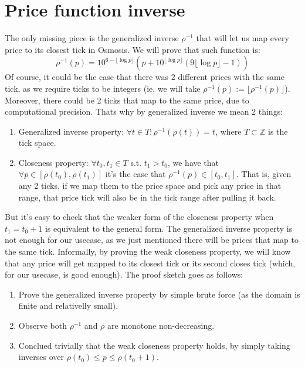 \documentclass[11pt]{article}
\begin{document}
\section{Price function inverse}
The only missing piece is the generalized inverse $\rho^{-1}$ that will let
us map every price to its closest tick in Osmosis. We will prove that such
function is:
\[
\rho^{-1}(p) = 10^{6-\lfloor\log p\rfloor} \left(
	p+10^{\lfloor\log p\rfloor}\left(
		9\lfloor\log p\rfloor-1
	\right)
\right)
\]
Of course, it could be the case that there was 2 different prices with the same
tick, as we require ticks to be integers (ie, we will take $\rho^{-1}(p) :=
\lfloor \rho^{-1}(p)\rfloor$). Moreover, there could be 2 ticks that map to the
same price, due to computational precision. Thats why by generalized inverse we
mean 2 things:
\begin{enumerate}
    \item Generalized inverse property: $\forall t\in T: \rho^{-1}(\rho(t)) =
        t$, where $T\subset\mathbb Z$ is the tick space.
    \item Closeness property: $\forall t_0, t_1\in T$ s.t. $t_1 > t_0$, we have
        that $\forall p\in [\rho(t_0), \rho(t_1)]$ it's the case that
        $\rho^{-1}(p)\in[t_0, t_1]$. That is, given any 2 ticks, if we map them
        to the price space and pick any price in that range, that price tick will
        also be in the tick range after pulling it back.
\end{enumerate}
But it's easy to check that the weaker form of the closeness property when $t_1
= t_0 + 1$ is equivalent to the general form. The generalized inverse property
is not enough for our usecase, as we just mentioned there will be prices that
map to the same tick. Informally, by proving the weak closeness
property, we will know that any price will get mapped to its closest tick or
its second closes tick (which, for our usecase, is good enough). The proof
sketch goes as follows:
\begin{enumerate}
    \item Prove the generalized inverse property by simple brute force (as the
        domain is finite and relativelly small).
    \item Observe both $\rho^{-1}$ and $\rho$ are monotone non-decreasing.
    \item Conclued trivially that the weak closeness property holds, by simply
        taking inverses over $\rho(t_0) \leq p \leq \rho(t_0 + 1)$.
\end{enumerate}
\end{document}
